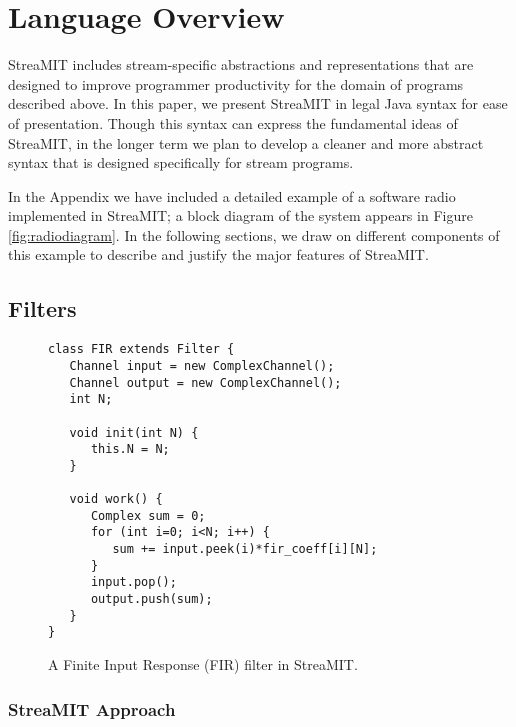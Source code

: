 \section{Language Overview}

\begin{figure*}
\centering
{}
\caption{A block diagram of a software radio.  A detailed
implementation in StreaMIT appears in the Appendix.}
\label{fig:radiodiagram}
\end{figure*}

StreaMIT includes stream-specific abstractions and representations
that are designed to improve programmer productivity for the domain of
programs described above.  In this paper, we present StreaMIT in legal
Java syntax for ease of presentation.  Though this syntax can express
the fundamental ideas of StreaMIT, in the longer term we plan to
develop a cleaner and more abstract syntax that is designed
specifically for stream programs.

In the Appendix we have included a detailed example of a software
radio implemented in StreaMIT; a block diagram of the system appears
in Figure \ref{fig:radiodiagram}.  In the following sections, we draw
on different components of this example to describe and justify the
major features of StreaMIT.

\subsection{Filters}

\begin{figure}
\scriptsize
\begin{verbatim}
class FIR extends Filter {
   Channel input = new ComplexChannel();
   Channel output = new ComplexChannel();           
   int N;

   void init(int N) {
      this.N = N;
   }

   void work() {
      Complex sum = 0;
      for (int i=0; i<N; i++) {
         sum += input.peek(i)*fir_coeff[i][N];
      }
      input.pop();
      output.push(sum);
   }
}
\end{verbatim}
\vspace{-12pt}
\caption{\protect\small A Finite Input Response (FIR) filter in StreaMIT.
\protect\label{fig:firfilter}}
\vspace{-12pt}
\end{figure}

\subsubsection{StreaMIT Approach}


